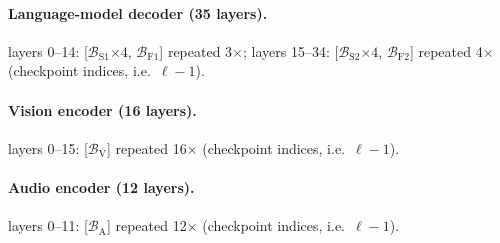 \documentclass[10pt,a4paper]{article}
\theoremstyle{definition}
\begin{document}
\paragraph{Language-model decoder (35 layers).} 
layers 0--14: [$\mathcal{B}_{\mathrm{S1}}$$\times4$, $\mathcal{B}_{\mathrm{F1}}$] repeated 3$\times$; layers 15--34: [$\mathcal{B}_{\mathrm{S2}}$$\times4$, $\mathcal{B}_{\mathrm{F2}}$] repeated 4$\times$ (checkpoint indices, i.e.\ $\ell-1$).
\paragraph{Vision encoder (16 layers).} 
layers 0--15: [$\mathcal{B}_{\mathrm{V}}$] repeated 16$\times$ (checkpoint indices, i.e.\ $\ell-1$).
\paragraph{Audio encoder (12 layers).} 
layers 0--11: [$\mathcal{B}_{\mathrm{A}}$] repeated 12$\times$ (checkpoint indices, i.e.\ $\ell-1$).
\end{document}
